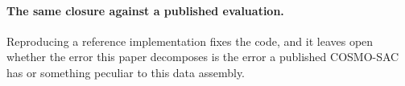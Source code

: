 \paragraph{The same closure against a published evaluation.}
Reproducing a reference implementation fixes the code, and it leaves open whether the error this
paper decomposes is the error a published COSMO-SAC has or something peculiar to this data assembly.
